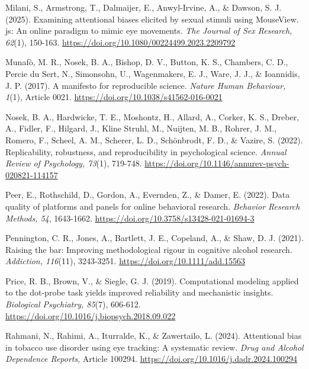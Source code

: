 \documentclass[authordate, reflection, issue]{jote-new-article}
\begin{document}
	Milani, S., Armstrong, T., Dalmaijer, E., Anwyl-Irvine, A., \& Dawson, S. J. (2025). Examining attentional biases elicited by sexual stimuli using MouseView. js: An online paradigm to mimic eye movements. \emph{The Journal of Sex Research, 62}(1), 150-163. \url{https://doi.org/10.1080/00224499.2023.2209792}



	Munafò, M. R., Nosek, B. A., Bishop, D. V., Button, K. S., Chambers, C. D., Percie du Sert, N., Simonsohn, U., Wagenmakers, E. J., Ware, J. J., \& Ioannidis, J. P. (2017). A manifesto for reproducible science. \emph{Nature Human Behaviour, 1}(1), Article 0021. \url{https://doi.org/10.1038/s41562-016-0021}



	Nosek, B. A., Hardwicke, T. E., Moshontz, H., Allard, A., Corker, K. S., Dreber, A., Fidler, F., Hilgard, J., Kline Struhl, M., Nuijten, M. B., Rohrer, J. M., Romero, F., Scheel, A. M., Scherer, L. D., Schönbrodt, F. D., \& Vazire, S. (2022). Replicability, robustness, and reproducibility in psychological science. \emph{Annual Review of Psychology, 73}(1), 719-748. \url{https://doi.org/10.1146/annurev-psych-020821-114157}



	Peer, E., Rothschild, D., Gordon, A., Evernden, Z., \& Damer, E. (2022). Data quality of platforms and panels for online behavioral research. \emph{Behavior Research Methods, 54}, 1643-1662. \url{https://doi.org/10.3758/s13428-021-01694-3}



	Pennington, C. R., Jones, A., Bartlett, J. E., Copeland, A., \& Shaw, D. J. (2021). Raising the bar: Improving methodological rigour in cognitive alcohol research. \emph{Addiction, 116}(11), 3243-3251. \url{https://doi.org/10.1111/add.15563}



	Price, R. B., Brown, V., \& Siegle, G. J. (2019). Computational modeling applied to the dot-probe task yields improved reliability and mechanistic insights. \emph{Biological Psychiatry, 85}(7), 606-612. \url{https://doi.org/10.1016/j.biopsych.2018.09.022}



	Rahmani, N., Rahimi, A., Iturralde, K., \& Zawertailo, L. (2024). Attentional bias in tobacco use disorder using eye tracking: A systematic review. \emph{Drug and Alcohol Dependence Reports}, Article 100294. \url{https://doi.org/10.1016/j.dadr.2024.100294}
\end{document}
